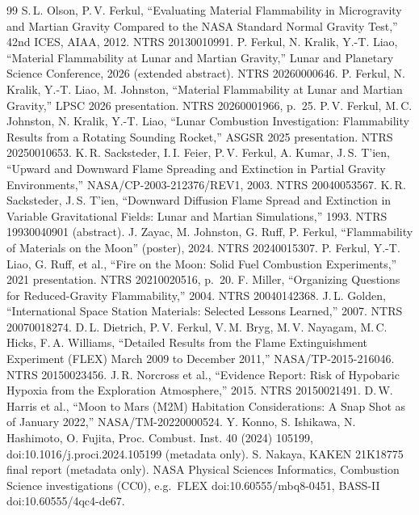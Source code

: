 \documentclass[10pt]{article}
\begin{document}
\small
\begin{thebibliography}{99}
 S.\,L. Olson, P.\,V. Ferkul, ``Evaluating Material Flammability in Microgravity and Martian Gravity Compared to the NASA Standard Normal Gravity Test,'' 42nd ICES, AIAA, 2012. NTRS 20130010991.
 P. Ferkul, N. Kralik, Y.-T. Liao, ``Material Flammability at Lunar and Martian Gravity,'' Lunar and Planetary Science Conference, 2026 (extended abstract). NTRS 20260000646.
 P. Ferkul, N. Kralik, Y.-T. Liao, M. Johnston, ``Material Flammability at Lunar and Martian Gravity,'' LPSC 2026 presentation. NTRS 20260001966, p.~25.
 P.\,V. Ferkul, M.\,C. Johnston, N. Kralik, Y.-T. Liao, ``Lunar Combustion Investigation: Flammability Results from a Rotating Sounding Rocket,'' ASGSR 2025 presentation. NTRS 20250010653.
 K.\,R. Sacksteder, I.\,I. Feier, P.\,V. Ferkul, A. Kumar, J.\,S. T'ien, ``Upward and Downward Flame Spreading and Extinction in Partial Gravity Environments,'' NASA/CP-2003-212376/REV1, 2003. NTRS 20040053567.
 K.\,R. Sacksteder, J.\,S. T'ien, ``Downward Diffusion Flame Spread and Extinction in Variable Gravitational Fields: Lunar and Martian Simulations,'' 1993. NTRS 19930040901 (abstract).
 J. Zayac, M. Johnston, G. Ruff, P. Ferkul, ``Flammability of Materials on the Moon'' (poster), 2024. NTRS 20240015307.
 P. Ferkul, Y.-T. Liao, G. Ruff, et al., ``Fire on the Moon: Solid Fuel Combustion Experiments,'' 2021 presentation. NTRS 20210020516, p.~20.
 F. Miller, ``Organizing Questions for Reduced-Gravity Flammability,'' 2004. NTRS 20040142368.
 J.\,L. Golden, ``International Space Station Materials: Selected Lessons Learned,'' 2007. NTRS 20070018274.
 D.\,L. Dietrich, P.\,V. Ferkul, V.\,M. Bryg, M.\,V. Nayagam, M.\,C. Hicks, F.\,A. Williams, ``Detailed Results from the Flame Extinguishment Experiment (FLEX) March 2009 to December 2011,'' NASA/TP-2015-216046. NTRS 20150023456.
 J.\,R. Norcross et al., ``Evidence Report: Risk of Hypobaric Hypoxia from the Exploration Atmosphere,'' 2015. NTRS 20150021491.
 D.\,W. Harris et al., ``Moon to Mars (M2M) Habitation Considerations: A Snap Shot as of January 2022,'' NASA/TM-20220000524.
 Y. Konno, S. Ishikawa, N. Hashimoto, O. Fujita, Proc. Combust. Inst. 40 (2024) 105199, doi:10.1016/j.proci.2024.105199 (metadata only).
 S. Nakaya, KAKEN 21K18775 final report (metadata only).
 NASA Physical Sciences Informatics, Combustion Science investigations (CC0), e.g.\ FLEX doi:10.60555/mbq8-0451, BASS-II doi:10.60555/4qc4-de67.
\end{thebibliography}
\end{document}
